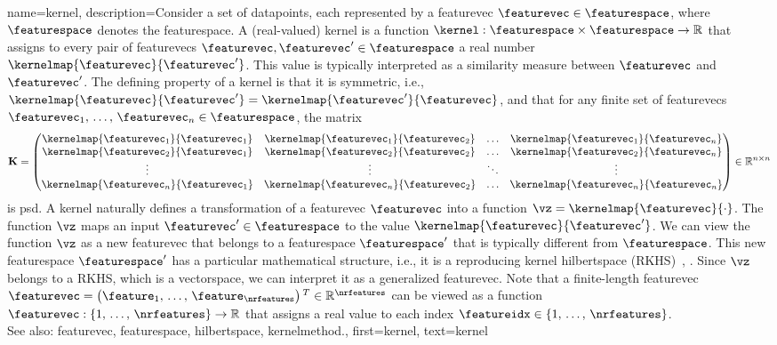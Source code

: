 {name={kernel}, 
	description={Consider a set of \glspl{datapoint}, each represented by a \gls{featurevec} 
	 	$\featurevec \in \featurespace$, where $\featurespace$ denotes the \gls{featurespace}. 
	 	A (real-valued) kernel is a \gls{function} 
	 	$\kernel: \featurespace \times \featurespace \rightarrow \mathbb{R}$ that assigns to every pair of 
     		\glspl{featurevec} $\featurevec, \featurevec' \in \featurespace$ a real number $\kernelmap{\featurevec}{\featurevec'}$. 
     		This value is typically interpreted as a similarity measure between $\featurevec$ and $\featurevec'$. 
	 	The defining property of a kernel is that it is symmetric, i.e.,
	 	$\kernelmap{\featurevec}{\featurevec'} = \kernelmap{\featurevec'}{\featurevec}$, and that 
	 	for any finite set of \glspl{featurevec} $\featurevec_1, \,\ldots, \,\featurevec_n \in \featurespace$, the \gls{matrix} 
	  	\begin{equation}
	 		\nonumber
	 		\mathbf{K} = \begin{pmatrix}
	 			\kernelmap{\featurevec_1}{\featurevec_1} & \kernelmap{\featurevec_1}{\featurevec_2} & \ldots & \kernelmap{\featurevec_1}{\featurevec_n} \\
	 			\kernelmap{\featurevec_2}{\featurevec_1} & \kernelmap{\featurevec_2}{\featurevec_2} & \ldots & \kernelmap{\featurevec_2}{\featurevec_n} \\
	 			\vdots											
	 			& \vdots & \ddots & \vdots \\
	 			\kernelmap{\featurevec_n}{\featurevec_1} & \kernelmap{\featurevec_n}{\featurevec_2} & \ldots & \kernelmap{\featurevec_n}{\featurevec_n} 
	 		\end{pmatrix} \in \mathbb{R}^{n \times n}
	 	\end{equation}
	 	is \gls{psd}. 
     		A kernel naturally defines a transformation of a \gls{featurevec} $\featurevec$ into a 
	 	\gls{function} $\vz = \kernelmap{\featurevec}{\cdot}$. The \gls{function} $\vz$ maps an  
	 	input $\featurevec' \in \featurespace$ to the value $\kernelmap{\featurevec}{\featurevec'}$. 
	 	We can view the \gls{function} $\vz$ as a new \gls{featurevec} that belongs to a 
	 	\gls{featurespace} $\featurespace'$ that is typically different from $\featurespace$. 
	 	This new \gls{featurespace} $\featurespace'$ has a particular mathematical structure, i.e., it is a 
	 	reproducing kernel \gls{hilbertspace} (RKHS)~\cite{LearningKernelsBook}, \cite{LampertNowKernel}.
     		Since $\vz$ belongs to a RKHS, which is a \gls{vectorspace}, we can interpret it as a generalized 
	 	\gls{featurevec}. Note that a finite-length \gls{featurevec} $\featurevec=\big(\feature_{1}, \,\ldots, \,\feature_{\nrfeatures} \big)\,^{T} \in \mathbb{R}^{\nrfeatures}$ 
	 	can be viewed as a \gls{function} $\featurevec: \{1, \,\ldots, \,\nrfeatures\} \rightarrow \mathbb{R}$ 
	 	that assigns a real value to each index $\featureidx \in \{1, \,\ldots, \,\nrfeatures\}$.
          		\\
		See also: \gls{featurevec}, \gls{featurespace}, \gls{hilbertspace}, \gls{kernelmethod}.},
	first={kernel},
	text={kernel} 
}
	
